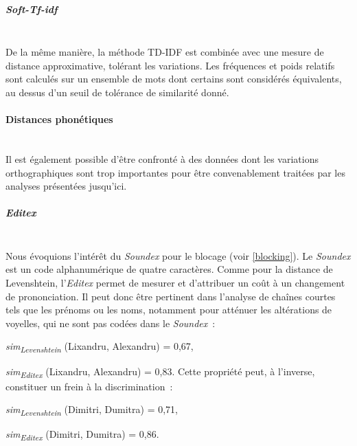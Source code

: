 \documentclass[a4paper,12pt,twoside]{book}
\begin{document}
                \subparagraph{Soft-Tf-idf}\mbox{} \\
                
                De la même manière, la méthode TD-IDF est combinée avec une mesure de distance approximative, tolérant les variations. Les fréquences et poids relatifs sont calculés sur un ensemble de mots dont certains sont considérés équivalents, au dessus d'un seuil de tolérance de similarité donné. 
                
                \paragraph{Distances phonétiques}\mbox{} \\
                
                Il est également possible d'être confronté à des données dont les variations orthographiques sont trop importantes pour être convenablement traitées par les analyses présentées jusqu'ici.
                
                \subparagraph{Editex}\mbox{} \\
                
                Nous évoquions l'intérêt du \textit{Soundex} pour le blocage (voir \ref{blocking}). Le \textit{Soundex} est un code alphanumérique de quatre caractères. Comme pour la distance de Levenshtein, l'\textit{Editex} permet de mesurer et d'attribuer un coût à un changement de prononciation. Il peut donc être pertinent dans l'analyse de chaînes courtes tels que les prénoms ou les noms, notamment pour atténuer les altérations de voyelles, qui ne sont pas codées dans le \textit{Soundex}~:
                
                \textit{sim\textsubscript{Levenshtein}} (Lixandru, Alexandru) = 0,67,
                
                \textit{sim\textsubscript{Editex}} (Lixandru, Alexandru) = 0,83.
                \vspace{0.2cm}
                \newline
                Cette propriété peut, à l'inverse, constituer un frein à la discrimination~:
                \vspace{0.2cm}
                
                \textit{sim\textsubscript{Levenshtein}} (Dimitri, Dumitra) = 0,71,
                
                \textit{sim\textsubscript{Editex}} (Dimitri, Dumitra) = 0,86.
                
\end{document}

